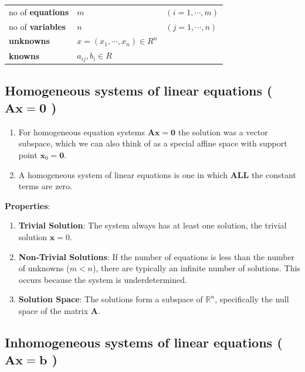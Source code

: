 \begin{table}[h]
    \begin{tabular}{l l l}
        no of \textbf{equations} & $m$ & $(i=1,\cdots,m)$\\
        no of \textbf{variables} & $n$ & $(j=1,\cdots,n)$ \\
        \textbf{unknowns} & $x = (x_1,\cdots,x_n) \in R^n$\\
        \textbf{knowns} & $a_{ij}, b_{i} \in R$
    \end{tabular}
\end{table}


\subsection{Homogeneous systems of linear equations ( $\mathbf{Ax = 0}$ ) \cite{mfml-1, chatgpt}}\label{Homogeneous systems of linear equations}

\begin{enumerate}
    \item For homogeneous equation systems $\mathbf{Ax = 0}$ the solution was a vector subspace, which we can also think of as a special affine space with support point $\mathbf{x}_0 = \mathbf{0}$.

    \item A homogeneous system of linear equations is one in which \textbf{ALL} the constant terms are zero.
\end{enumerate}

\vspace{0.2cm}
\textbf{Properties}:
\begin{enumerate}
    \item \textbf{Trivial Solution}: The system always has at least one solution, the trivial solution $\mathbf{x}=0$.

    \item \textbf{Non-Trivial Solutions}: If the number of equations is less than the number of unknowns ($m<n$), there are typically an infinite number of solutions. This occurs because the system is underdetermined.

    \item \textbf{Solution Space}: The solutions form a subspace of $\mathbb{R}^n$, specifically the null space of the matrix $\mathbf{A}$.
\end{enumerate}



\subsection{Inhomogeneous systems of linear equations ( $\mathbf{Ax = b}$ ) \cite{mfml-1, chatgpt}}\label{Inhomogeneous systems of linear equations}


